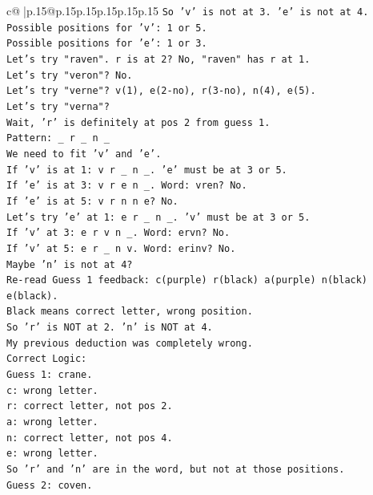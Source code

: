 \documentclass{article}
\begin{document}
{\begin{supertabular}{c@{$\;$}|p{.15\linewidth}@{}p{.15\linewidth}p{.15\linewidth}p{.15\linewidth}p{.15\linewidth}p{.15\linewidth}}
{{{\texttt{So 'v' is not at 3. 'e' is not at 4.} \\
\texttt{Possible positions for 'v': 1 or 5.} \\
\texttt{Possible positions for 'e': 1 or 3.} \\
\texttt{Let's try "raven". r is at 2? No, "raven" has r at 1.} \\
\texttt{Let's try "veron"? No.} \\
\texttt{Let's try "verne"? v(1), e(2{-}no), r(3{-}no), n(4), e(5).} \\
\texttt{Let's try "verna"?} \\
\texttt{Wait, 'r' is definitely at pos 2 from guess 1.} \\
\texttt{Pattern: \_ r \_ n \_} \\
\texttt{We need to fit 'v' and 'e'.} \\
\texttt{If 'v' is at 1: v r \_ n \_. 'e' must be at 3 or 5.} \\
\texttt{If 'e' is at 3: v r e n \_. Word: vren? No.} \\
\texttt{If 'e' is at 5: v r n n e? No.} \\
\texttt{Let's try 'e' at 1: e r \_ n \_. 'v' must be at 3 or 5.} \\
\texttt{If 'v' at 3: e r v n \_. Word: ervn? No.} \\
\texttt{If 'v' at 5: e r \_ n v. Word: erinv? No.} \\
\texttt{Maybe 'n' is not at 4?} \\
\texttt{Re{-}read Guess 1 feedback: c(purple) r(black) a(purple) n(black) e(black).} \\
\texttt{Black means correct letter, wrong position.} \\
\texttt{So 'r' is NOT at 2. 'n' is NOT at 4.} \\
\texttt{My previous deduction was completely wrong.} \\
\texttt{Correct Logic:} \\
\texttt{Guess 1: crane.} \\
\texttt{c: wrong letter.} \\
\texttt{r: correct letter, not pos 2.} \\
\texttt{a: wrong letter.} \\
\texttt{n: correct letter, not pos 4.} \\
\texttt{e: wrong letter.} \\
\texttt{So 'r' and 'n' are in the word, but not at those positions.} \\
\texttt{Guess 2: coven.} \\
}}}
\end{supertabular}}
\end{document}
